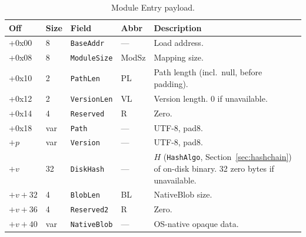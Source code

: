 \documentclass[11pt,a4paper]{article}
\newcommand{\field}[1]{\texttt{#1}}
\begin{document}
\begin{table}[H]\centering\caption{Module Entry payload.}\label{tab:modentry}\small
\begin{tabular}{M M l l p{4cm}}\toprule\textbf{Off}&\textbf{Size}&\textbf{Field}&\textbf{Abbr}&\textbf{Description}\\\midrule
+0x00 & 8 & \field{BaseAddr} & --- & Load address. \\
+0x08 & 8 & \field{ModuleSize} & ModSz & Mapping size. \\
+0x10 & 2 & \field{PathLen} & PL & Path length (incl.\ null, before padding). \\
+0x12 & 2 & \field{VersionLen} & VL & Version length. 0 if unavailable. \\
+0x14 & 4 & \field{Reserved} & R & Zero. \\
+0x18 & var & \field{Path} & --- & UTF-8, pad8. \\
$+p$ & var & \field{Version} & --- & UTF-8, pad8. \\
$+v$ & 32 & \field{DiskHash} & --- & $H$ (\field{HashAlgo}, Section~\ref{sec:hashchain}) of on-disk binary. 32 zero bytes if unavailable. \\
$+v{+}32$ & 4 & \field{BlobLen} & BL & NativeBlob size. \\
$+v{+}36$ & 4 & \field{Reserved2} & R & Zero. \\
$+v{+}40$ & var & \field{NativeBlob} & --- & OS-native opaque data. \\\bottomrule
\end{tabular}\end{table}
\end{document}
